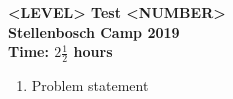 \documentclass{article}
\begin{document}
\begin{center}
  \textbf{\Large <LEVEL> Test <NUMBER>}
  \\ \vspace{1em}
  \textbf{\large Stellenbosch Camp 2019}
  \\ \vspace{1em}
  \textbf{\large Time: $2\frac{1}{2}$ hours}
\end{center}


\begin{enumerate}[1.]

\item %
Problem statement

\end{enumerate}
\end{document}

